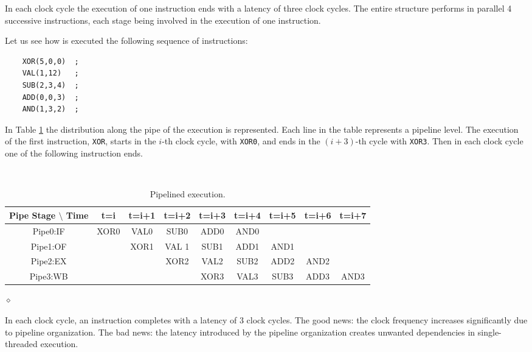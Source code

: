 In each clock cycle the execution of one instruction ends with a latency of three clock cycles. The entire structure performs in parallel 4 successive instructions, each stage being involved in the execution of one instruction.

\begin{exemplu}
Let us see how is executed the following sequence of instructions:
\begin{verbatim}
    XOR(5,0,0)  ;
    VAL(1,12)   ;
    SUB(2,3,4)  ;
    ADD(0,0,3)  ;
    AND(1,3,2)  ;
\end{verbatim}
In Table \ref{pipeEx} the distribution along the pipe of the execution is represented. Each line in the table represents a pipeline level. The execution of the first instruction, {\tt XOR}, starts in the $i$-th clock cycle, with {\tt XOR0}, and ends in the $(i+3)$-th cycle with {\tt XOR3}. Then in each clock cycle one of the following instruction ends.

\begin{table}[H]
  \begin{center}
    \caption{Pipelined execution.}
    \label{pipeEx}
    {\small
    {\tt
    \begin{tabular}{|c||c|c|c|c|c|c|c|c|}
      \hline
     Pipe Stage $\setminus$ Time    & t=i & t=i+1 & t=i+2 & t=i+3 & t=i+4 & t=i+5 & t=i+6 & t=i+7   \\ \hline \hline
        Pipe0:IF        & XOR0 & VAL0   & SUB0   & ADD0   & AND0   &      &       &         \\ \hline
        Pipe1:OF        &     & XOR1   & VAL 1  & SUB1   & ADD1   & AND1   &          &         \\ \hline
        Pipe2:EX        &     &       & XOR2   & VAL2   & SUB2   & ADD2   & AND2   &        \\ \hline
        Pipe3:WB        &     &       &       & XOR3   & VAL3   & SUB3   & ADD3   & AND3        \\ \hline
    \end{tabular}
    }
    }
  \end{center}
\end{table}
$\diamond$
\end{exemplu}

In each clock cycle, an instruction completes with a latency of 3 clock cycles. The good news: the clock frequency increases significantly due to pipeline organization. The bad news: the latency introduced by the pipeline organization creates unwanted dependencies in single-threaded execution.

